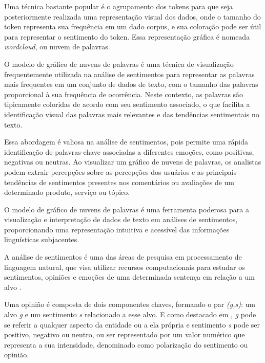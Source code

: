 Uma técnica bastante popular é o agrupamento dos tokens para que seja posteriormente realizada uma representação visual dos dados, onde o tamanho do token representa sua frequência em um dado corpus, e sua coloração pode ser útil para representar o sentimento do token. Essa representação gráfica é nomeada \textit{wordcloud}, ou nuvem de palavras.

O modelo de gráfico de nuvens de palavras é uma técnica de visualização frequentemente utilizada na análise de sentimentos para representar as palavras mais frequentes em um conjunto de dados de texto, com o tamanho das palavras proporcional à sua frequência de ocorrência. Neste contexto, as palavras são tipicamente coloridas de acordo com seu sentimento associado, o que facilita a identificação visual das palavras mais relevantes e das tendências sentimentais no texto.

Essa abordagem é valiosa na análise de sentimentos, pois permite uma rápida identificação de palavras-chave associadas a diferentes emoções, como positivas, negativas ou neutras. Ao visualizar um gráfico de nuvens de palavras, os analistas podem extrair percepções sobre as percepções dos usuários e as principais tendências de sentimentos presentes nos comentários ou avaliações de um determinado produto, serviço ou tópico.

O modelo de gráfico de nuvens de palavras é uma ferramenta poderosa para a visualização e interpretação de dados de texto em análises de sentimentos, proporcionando uma representação intuitiva e acessível das informações linguísticas subjacentes.

A análise de sentimentos é uma das áreas de pesquisa em processamento de linguagem natural, que visa utilizar recursos computacionais para estudar os sentimentos, opiniões e emoções de uma determinada sentença em relação a um alvo \cite{Bellini2019}.

Uma opinião é composta de dois componentes chaves, formando o par \textit{(g,s)}: um alvo \textit{g} e um sentimento \textit{s} relacionado a esse alvo. E como destacado em \cite{Machado2018}, \textit{g} pode se referir a qualquer aspecto da entidade ou a ela própria e sentimento \textit{s} pode ser positivo, negativo ou neutro, ou ser representado por um valor numérico que representa a sua intensidade, denominado como polarização do sentimento ou opinião.
